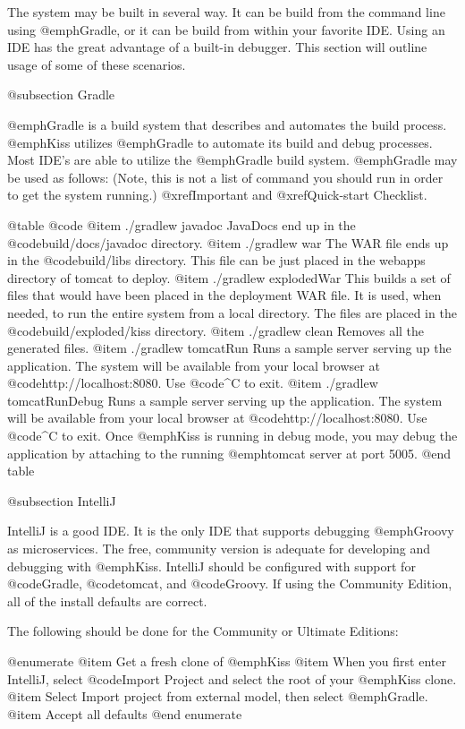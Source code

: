 The system may be built in several way.  It can be build from the
command line using @emph{Gradle}, or it can be build from within your
favorite IDE.  Using an IDE has the great advantage of a built-in
debugger.  This section will outline usage of some of these scenarios.

@subsection Gradle 

@emph{Gradle} is a build system that describes and automates the build process.
@emph{Kiss} utilizes @emph{Gradle} to automate its build and debug processes.
Most IDE's are able to utilize the @emph{Gradle} build system.
@emph{Gradle} may be used as follows:
(Note, this is not a list of command you should run in order to get the system running.) 
@xref{Important} and @xref{Quick-start Checklist}.

@table @code
@item ./gradlew javadoc
JavaDocs end up in the @code{build/docs/javadoc} directory.
@item ./gradlew war
The WAR file ends up in the @code{build/libs} directory.  
This file can be just placed in the webapps directory of tomcat to deploy.
@item ./gradlew explodedWar
This builds a set of files that would have been placed in the deployment WAR file.  It is used, when needed,
to run the entire system from a local directory.  The files are placed in the @code{build/exploded/kiss}
directory.
@item ./gradlew clean
Removes all the generated files.
@item ./gradlew tomcatRun
Runs a sample server serving up the application.  The system will be
available from your local browser at
@code{http://localhost:8080}.  Use @code{^C} to exit.
@item ./gradlew tomcatRunDebug
Runs a sample server serving up the application.  The system will be
available from your local browser at
@code{http://localhost:8080}.  Use @code{^C} to exit. Once @emph{Kiss} is running in debug mode,
you may debug the application by attaching to the running @emph{tomcat} server at port 5005.
@end table

@subsection IntelliJ

IntelliJ is a good IDE.  It is the only IDE that supports debugging
@emph{Groovy} as microservices.  The free, community version is adequate for developing
and debugging with @emph{Kiss}.  IntelliJ should be configured with
support for @code{Gradle}, @code{tomcat}, and @code{Groovy}.  If using the Community Edition, all of the install defaults are correct. 

The following should be done for the Community or Ultimate Editions:

@enumerate
@item
Get a fresh clone of @emph{Kiss}
@item
When you first enter IntelliJ, select @code{Import Project} and select the root of your @emph{Kiss} clone.
@item
Select Import project from external model, then select @emph{Gradle}.
@item
Accept all defaults
@end enumerate

